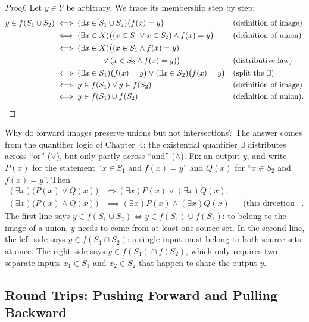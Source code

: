 \begin{proof}
Let $y \in Y$ be arbitrary. We trace its membership step by step:
\begin{align*}
y \in f(S_1 \cup S_2)
&\iff (\exists x \in S_1 \cup S_2)\bigl(f(x) = y\bigr) && \text{(definition of image)} \\
&\iff (\exists x \in X)\bigl((x \in S_1 \lor x \in S_2) \land f(x) = y\bigr) && \text{(definition of union)} \\
&\iff (\exists x \in X)\bigl((x \in S_1 \land f(x) = y) \\
&\qquad\qquad\qquad \lor (x \in S_2 \land f(x) = y)\bigr) && \text{(distributive law)} \\
&\iff (\exists x \in S_1)\bigl(f(x) = y\bigr) \lor (\exists x \in S_2)\bigl(f(x) = y\bigr) && \text{(split the $\exists$)} \\
&\iff y \in f(S_1) \lor y \in f(S_2) && \text{(definition of image)} \\
&\iff y \in f(S_1) \cup f(S_2) && \text{(definition of union)}. \qedhere
\end{align*}
\end{proof}

Why do forward images preserve unions but not intersections? The answer comes from the quantifier logic of Chapter~4: the existential quantifier $\exists$ distributes across ``or'' ($\lor$), but only partly across ``and'' ($\land$). Fix an output $y$, and write $P(x)$ for the statement ``$x \in S_1$ and $f(x) = y$'' and $Q(x)$ for ``$x \in S_2$ and $f(x) = y$''. Then
\begin{align*}
(\exists x)\bigl(P(x) \lor Q(x)\bigr) &\iff (\exists x)P(x) \lor (\exists x)Q(x), \\
(\exists x)\bigl(P(x) \land Q(x)\bigr) &\implies (\exists x)P(x) \land (\exists x)Q(x) && \text{(this direction only)}.
\end{align*}
The first line says $y \in f(S_1 \cup S_2) \iff y \in f(S_1) \cup f(S_2)$: to belong to the image of a union, $y$ needs to come from at least one source set. In the second line, the left side says $y \in f(S_1 \cap S_2)$: a single input must belong to both source sets at once. The right side says $y \in f(S_1) \cap f(S_2)$, which only requires two separate inputs $x_1 \in S_1$ and $x_2 \in S_2$ that happen to share the output $y$.

\subsection{Round Trips: Pushing Forward and Pulling Backward}

